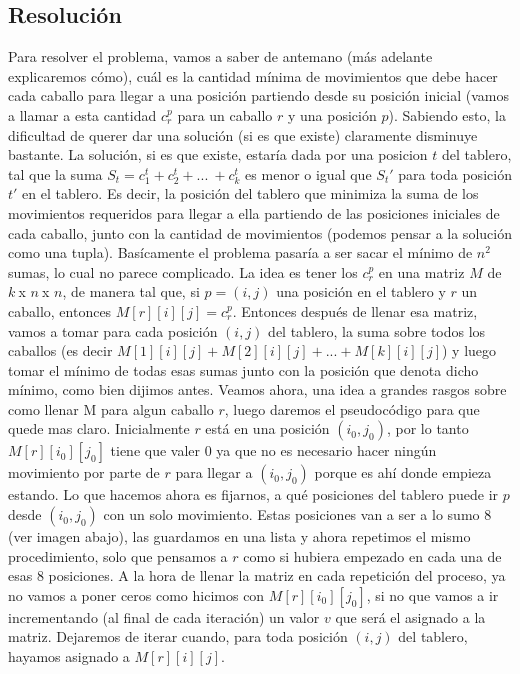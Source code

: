 \documentclass[a4paper]{article}
\begin{document}
\subsection{Resolución}
Para resolver el problema, vamos a saber de antemano (más adelante explicaremos cómo), cuál es la cantidad mínima de movimientos que debe hacer cada caballo para llegar a una posición partiendo desde su posición inicial (vamos a llamar a esta cantidad $c_{r}^{p}$ para un caballo $r$ y una posición $p$). Sabiendo esto, la dificultad de querer dar una solución (si es que existe) claramente disminuye bastante. La solución, si es que existe, estaría dada por una posicion $t$ del tablero, tal que la suma $S_t = c_{1}^{t} + c_{2}^{t} + ... \ + c_{k}^{t}$ es menor o igual que $S_t'$ para toda posición $t'$ en el tablero. Es decir, la posición del tablero que minimiza la suma de los movimientos requeridos para llegar a ella partiendo de las posiciones iniciales de cada caballo, junto con la cantidad de movimientos (podemos pensar a la solución como una tupla). Basícamente el problema pasaría a ser sacar el mínimo de $n^2$ sumas, lo cual no parece complicado.
\newline La idea es tener los $c_{r}^{p}$ en una matriz $M$ de $k \ $x $ n \ $x $ n$, de manera tal que, si $p = (i, j)$ una posición en el tablero y $r$ un caballo, entonces $M[r][i][j] = c_{r}^{p}$. Entonces después de llenar esa matriz, vamos a tomar para cada posición $(i, j)$ del tablero, la suma sobre todos los caballos (es decir $M[1][i][j] + M[2][i][j] + ... + M[k][i][j]$) y luego tomar el mínimo de todas esas sumas junto con la posición que denota dicho mínimo, como bien dijimos antes.
\newline
\newline Veamos ahora, una idea a grandes rasgos sobre como llenar M para algun caballo $r$, luego daremos el pseudocódigo para que quede mas claro.
\newline Inicialmente $r$ está en una posición $(i_0, j_0)$, por lo tanto $M[r][i_0][j_0]$ tiene que valer 0 ya que no es necesario hacer ningún movimiento por parte de $r$ para llegar a $(i_0, j_0)$ porque es ahí donde empieza estando. Lo que hacemos ahora es fijarnos, a qué posiciones del tablero puede ir $p$ desde $(i_0, j_0)$ con un solo movimiento. Estas posiciones van a ser a lo sumo 8 (ver imagen abajo), las guardamos en una lista y ahora repetimos el mismo procedimiento, solo que pensamos a $r$ como si hubiera empezado en cada una de esas 8 posiciones. A la hora de llenar la matriz en cada repetición del proceso, ya no vamos a poner ceros como hicimos con $M[r][i_0][j_0]$, si no que vamos a ir incrementando (al final de cada iteración) un valor $v$ que será el asignado a la matriz. Dejaremos de iterar cuando, para toda posición $(i, j)$ del tablero, hayamos asignado a $M[r][i][j]$.
\end{document}
